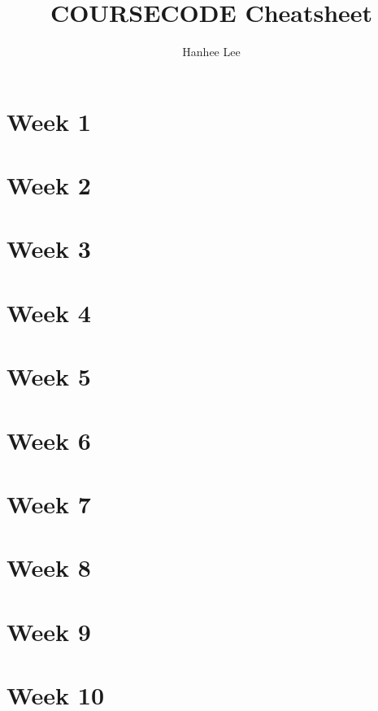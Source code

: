 \documentclass{article}
\title{COURSECODE Cheatsheet}
\author{Hanhee Lee}
\begin{document}
    \maketitle

    \tableofcontents

    \listoffigures

    \listoftables

    \section{Week 1}

    \section{Week 2}

    \section{Week 3}

    \section{Week 4}

    \section{Week 5}

    \section{Week 6}

    \section{Week 7}

    \section{Week 8}

    \section{Week 9}

    \section{Week 10}
\end{document}
